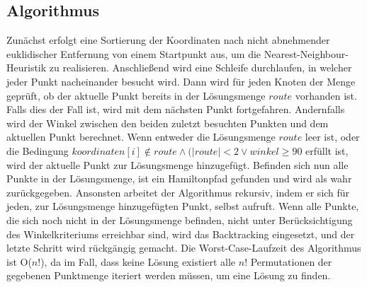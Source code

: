 \documentclass[a4paper,10pt,ngerman]{scrartcl}
\begin{document}
    \subsection{Algorithmus}\label{subsec:algorithmus}

    Zunächst erfolgt eine Sortierung der Koordinaten nach nicht abnehmender euklidischer Entfernung von einem Startpunkt aus,
    um die Nearest-Neighbour-Heuristik zu realisieren.
    Anschließend wird eine Schleife durchlaufen, in welcher jeder Punkt nacheinander besucht wird.
    Dann wird für jeden Knoten der Menge geprüft, ob der aktuelle Punkt bereits in der Lösungsmenge $route$ vorhanden ist.
    Falls dies der Fall ist, wird mit dem nächsten Punkt fortgefahren.
    Andernfalls wird der Winkel zwischen den beiden zuletzt besuchten Punkten und dem aktuellen Punkt berechnet.
    Wenn entweder die Lösungsmenge $route$ leer ist, oder die Bedingung $\textit{koordinaten}[i] \notin \textit{route} \land (|\textit{route}|<2 \lor \textit{winkel} \geq 90$ erfüllt ist,
    wird der aktuelle Punkt zur Lösungsmenge hinzugefügt.
    Befinden sich nun alle Punkte in der Lösungsmenge, ist ein Hamiltonpfad gefunden und wird als wahr zurückgegeben.
    Ansonsten arbeitet der Algorithmus rekursiv, indem er sich für jeden, zur Lösungsmenge hinzugefügten Punkt, selbst aufruft.
    Wenn alle Punkte, die sich noch nicht in der Lösungsmenge befinden, nicht unter Berücksichtigung des Winkelkriteriums erreichbar sind,
    wird das Backtracking eingesetzt, und der letzte Schritt wird rückgängig gemacht.
    Die Worst-Case-Laufzeit des Algorithmus ist O($n!$), da im Fall,
    dass keine Lösung existiert alle $n!$ Permutationen der gegebenen Punktmenge iteriert werden müssen, um eine Lösung zu finden.
\end{document}
